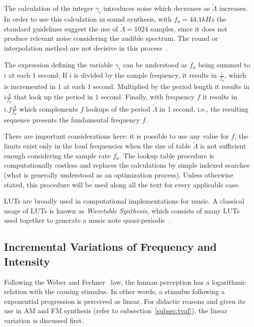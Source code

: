 \documentclass[
 aip,
 jmp,
 amsmath,amssymb,
 reprint,
]{revtex4-1}
\begin{document}
The calculation of the integer $\gamma_i$ introduces noise which decreases as $\widetilde{\Lambda}$ increases.
In order to use this calculation in sound synthesis, with $f_a=44.1 kHz$ the standard guidelines suggest the use of $\widetilde{\Lambda} = 1024$ samples, since it does not produce relevant noise considering the audible spectrum. The round or interpolation method are not decisive in this process~\cite{Geiger}.

The expression defining the variable $\gamma_i$ can be understood as $f_a$ being summed to $i$ at each $1$ second.
If $i$ is divided by the sample frequency, it results in $\frac{i}{f_a}$,
which is incremented in $1$ at each $1$ second. Multiplied by the period length it results in $i \frac{\widetilde{\Lambda}}{f_a}$ that look up the period in $1$ second. Finally, with frequency $f$ it results in $i . f \frac{\widetilde{\Lambda}}{f_a}$ which complements $f$ lookups of the period $\widetilde{\Lambda}$ in $1$ second, i.e., the resulting sequence presents the fundamental frequency $f$.

There are important considerations here: it is possible to use any value for $f$, the limits exist only in the loud frequencies when the size of table  $\widetilde{\Lambda}$ is not sufficient enough considering the sample rate $f_a$. The lookup table procedure is computationally costless and replaces the calculations by simple indexed searches (what is generally understood as an optimization process). Unless otherwise stated, this procedure will be used along all the text for every applicable case.

LUTs are broadly used in computational implementations for music. A classical usage of LUTs is known as \emph{Wavetable Synthesis}, which consists of many LUTs used together to generate a music note quasi-periodic~\cite{Cook,Wavetable}.

\subsection{Incremental Variations of Frequency and Intensity}\label{subsec:vars}

Following the Weber and Fechner~\cite{Weber-Fechner} law, the human perception has a logarithmic relation with the causing stimulus. In other words, a stimulus following a exponential progression is perceived as linear.
For didactic reasons and given its use in AM and FM synthesis (refer to subsection~\ref{subsec:tvaf}), the linear variation is discussed first.
\end{document}
